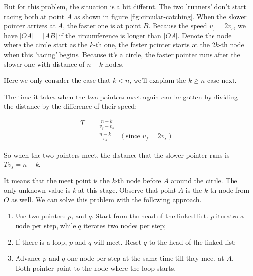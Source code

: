 \documentclass{article}
\begin{document}
But for this problem, the situation is a bit differnt. The two 'runners' don't
start racing both at point $A$ as shown in figure \ref{fig:circular-catching}.
When the slower pointer arrives
at $A$, the faster one is at point $B$. Because the speed $v_f = 2v_s$, we have
$|OA| = |AB|$ if the circumference is longer than $|OA|$.
Denote the node where the circle start as the $k$-th one, the
faster pointer starts at the $2k$-th node when this 'racing' begins. Because it's
a circle, the faster pointer runs after the slower one with distance of $n-k$ nodes.

Here we only consider the case that $k < n$, we'll exaplain the $k \geq n$ case next.

The time it takes when the two pointers meet again can be gotten by dividing the distance by
the difference of their speed:

\begin{equation}
\begin{array}{rlr}
T & = \displaystyle \frac{n-k}{v_f - v_s} & \\
  & = \displaystyle \frac{n-k}{v_s} & (\textrm{since } v_f = 2v_s)
\end{array}
\end{equation}

So when the two pointers meet, the distance that the slower pointer runs is $Tv_s = n - k$.

It means that the meet point is the $k$-th node before $A$ around the circle.
The only unknown value
is $k$ at this stage. Observe that point $A$ is the $k$-th node from $O$ as well.
We can solve this problem with the following approach.

\begin{enumerate}
\item Use two pointers $p$, and $q$. Start from the head of the linked-list. $p$ iterates
a node per step, while $q$ iterates two nodes per step;
\item If there is a loop, $p$ and $q$ will meet. Reset $q$ to the head of the linked-list;
\item Advance $p$ and $q$ one node per step at the same time till they meet at $A$. Both
pointer point to the node where the loop starts.
\end{enumerate}
\end{document}
